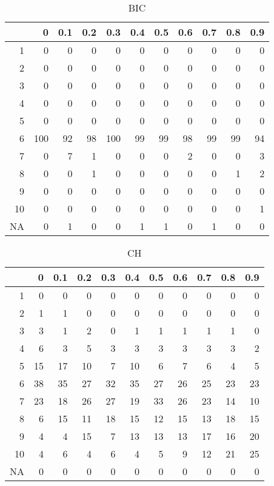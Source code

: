 \documentclass[11pt]{article}
\begin{document}
\begin{table}[H]
\centering
\begin{tabular}{rrrrrrrrrrr}
  \hline
 & 0 & 0.1 & 0.2 & 0.3 & 0.4 & 0.5 & 0.6 & 0.7 & 0.8 & 0.9 \\ 
  \hline
1 & 0 & 0 & 0 & 0 & 0 & 0 & 0 & 0 & 0 & 0 \\ 
  2 & 0 & 0 & 0 & 0 & 0 & 0 & 0 & 0 & 0 & 0 \\ 
  3 & 0 & 0 & 0 & 0 & 0 & 0 & 0 & 0 & 0 & 0 \\ 
  4 & 0 & 0 & 0 & 0 & 0 & 0 & 0 & 0 & 0 & 0 \\ 
  5 & 0 & 0 & 0 & 0 & 0 & 0 & 0 & 0 & 0 & 0 \\ 
  6 & 100 & 92 & 98 & 100 & 99 & 99 & 98 & 99 & 99 & 94 \\ 
  7 & 0 & 7 & 1 & 0 & 0 & 0 & 2 & 0 & 0 & 3 \\ 
  8 & 0 & 0 & 1 & 0 & 0 & 0 & 0 & 0 & 1 & 2 \\ 
  9 & 0 & 0 & 0 & 0 & 0 & 0 & 0 & 0 & 0 & 0 \\ 
  10 & 0 & 0 & 0 & 0 & 0 & 0 & 0 & 0 & 0 & 1 \\ 
  NA & 0 & 1 & 0 & 0 & 1 & 1 & 0 & 1 & 0 & 0 \\ 
   \hline
\end{tabular}
\caption{BIC} 
\end{table}
\begin{table}[H]
\centering
\begin{tabular}{rrrrrrrrrrr}
  \hline
 & 0 & 0.1 & 0.2 & 0.3 & 0.4 & 0.5 & 0.6 & 0.7 & 0.8 & 0.9 \\ 
  \hline
1 & 0 & 0 & 0 & 0 & 0 & 0 & 0 & 0 & 0 & 0 \\ 
  2 & 1 & 1 & 0 & 0 & 0 & 0 & 0 & 0 & 0 & 0 \\ 
  3 & 3 & 1 & 2 & 0 & 1 & 1 & 1 & 1 & 1 & 0 \\ 
  4 & 6 & 3 & 5 & 3 & 3 & 3 & 3 & 3 & 3 & 2 \\ 
  5 & 15 & 17 & 10 & 7 & 10 & 6 & 7 & 6 & 4 & 5 \\ 
  6 & 38 & 35 & 27 & 32 & 35 & 27 & 26 & 25 & 23 & 23 \\ 
  7 & 23 & 18 & 26 & 27 & 19 & 33 & 26 & 23 & 14 & 10 \\ 
  8 & 6 & 15 & 11 & 18 & 15 & 12 & 15 & 13 & 18 & 15 \\ 
  9 & 4 & 4 & 15 & 7 & 13 & 13 & 13 & 17 & 16 & 20 \\ 
  10 & 4 & 6 & 4 & 6 & 4 & 5 & 9 & 12 & 21 & 25 \\ 
  NA & 0 & 0 & 0 & 0 & 0 & 0 & 0 & 0 & 0 & 0 \\ 
   \hline
\end{tabular}
\caption{CH} 
\end{table}
\end{document}
